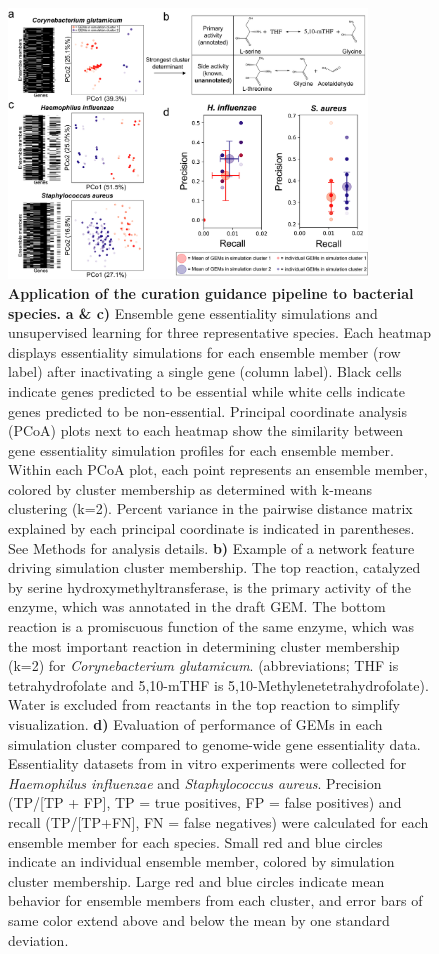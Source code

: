 \documentclass[11pt,onecolumn,notitlepage,openany,twoside]{book}
\begin{document}
\begin{refsection}
\begin{figure}
\centering
\includegraphics[width=0.85\textwidth]{ch3_fig3}
\caption[ Application of the curation guidance pipeline to bacterial species.]{\textbf{ Application of the curation guidance pipeline to bacterial species.}  \textbf{a \& c)} Ensemble gene essentiality simulations and unsupervised learning for three representative species. Each heatmap displays essentiality simulations for each ensemble member (row label) after inactivating a single gene (column label). Black cells indicate genes predicted to be essential while white cells indicate genes predicted to be non-essential. Principal coordinate analysis (PCoA) plots next to each heatmap show the similarity between gene essentiality simulation profiles for each ensemble member. Within each PCoA plot, each point represents an ensemble member, colored by cluster membership as determined with k-means clustering (k=2). Percent variance in the pairwise distance matrix explained by each principal coordinate is indicated in parentheses. See Methods for analysis details. \textbf{b)} Example of a network feature driving simulation cluster membership. The top reaction, catalyzed by serine hydroxymethyltransferase, is the primary activity of the enzyme, which was annotated in the draft GEM. The bottom reaction is a promiscuous function of the same enzyme, which was the most important reaction in determining cluster membership (k=2) for \textit{Corynebacterium glutamicum}. (abbreviations; THF is tetrahydrofolate and 5,10-mTHF is 5,10-Methylenetetrahydrofolate). Water is excluded from reactants in the top reaction to simplify visualization. \textbf{d)} Evaluation of performance of GEMs in each simulation cluster compared to genome-wide gene essentiality data. Essentiality datasets from in vitro experiments were collected for \textit{Haemophilus influenzae} and \textit{Staphylococcus aureus}. Precision (TP/[TP + FP], TP = true positives, FP = false positives) and recall (TP/[TP+FN], FN = false negatives) were calculated for each ensemble member for each species. Small red and blue circles indicate an individual ensemble member, colored by simulation cluster membership. Large red and blue circles indicate mean behavior for ensemble members from each cluster, and error bars of same color extend above and below the mean by one standard deviation.}
\end{figure}


\end{refsection}
\end{document}
